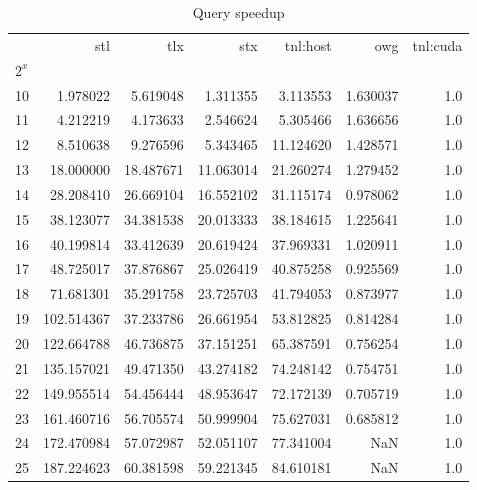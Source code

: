 \begin{table}
  \centering
  \begin{tabular}{lrrrrrr}
    \toprule
    {}    & stl        & tlx       & stx       & tnl:host  & owg      & tnl:cuda \\
    $2^x$ &            &           &           &           &          &          \\
    \midrule
    10    & 1.978022   & 5.619048  & 1.311355  & 3.113553  & 1.630037 & 1.0      \\
    11    & 4.212219   & 4.173633  & 2.546624  & 5.305466  & 1.636656 & 1.0      \\
    12    & 8.510638   & 9.276596  & 5.343465  & 11.124620 & 1.428571 & 1.0      \\
    13    & 18.000000  & 18.487671 & 11.063014 & 21.260274 & 1.279452 & 1.0      \\
    14    & 28.208410  & 26.669104 & 16.552102 & 31.115174 & 0.978062 & 1.0      \\
    15    & 38.123077  & 34.381538 & 20.013333 & 38.184615 & 1.225641 & 1.0      \\
    16    & 40.199814  & 33.412639 & 20.619424 & 37.969331 & 1.020911 & 1.0      \\
    17    & 48.725017  & 37.876867 & 25.026419 & 40.875258 & 0.925569 & 1.0      \\
    18    & 71.681301  & 35.291758 & 23.725703 & 41.794053 & 0.873977 & 1.0      \\
    19    & 102.514367 & 37.233786 & 26.661954 & 53.812825 & 0.814284 & 1.0      \\
    20    & 122.664788 & 46.736875 & 37.151251 & 65.387591 & 0.756254 & 1.0      \\
    21    & 135.157021 & 49.471350 & 43.274182 & 74.248142 & 0.754751 & 1.0      \\
    22    & 149.955514 & 54.456444 & 48.953647 & 72.172139 & 0.705719 & 1.0      \\
    23    & 161.460716 & 56.705574 & 50.999904 & 75.627031 & 0.685812 & 1.0      \\
    24    & 172.470984 & 57.072987 & 52.051107 & 77.341004 & NaN      & 1.0      \\
    25    & 187.224623 & 60.381598 & 59.221345 & 84.610181 & NaN      & 1.0      \\
    \bottomrule
  \end{tabular}
  \caption{Query speedup}
  \label{table:query-speedup}
\end{table}